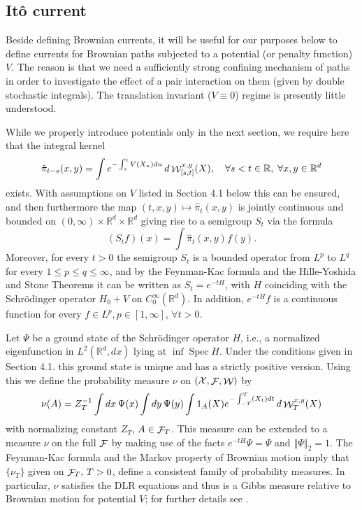 \documentclass[a4paper,11pt]{article}
\newcommand{\R}{\mathbb{R}}
\newcommand{\F}{\mathop{\mathrm{{\cal F}}}\nolimits}
\newcommand{\W}{\mathop{\mathrm{{\cal W}}}\nolimits}
\newcommand{\X}{\mathcal{X}}
\newcommand {\norm} [2] [] {\ensuremath{ \left\Vert  #2  \right\Vert_{#1} } }
\newcommand{\Spec}{\mathop{\mathrm{Spec}}\nolimits}
\newcounter {constant}
\begin{document}
\subsection{It\^o current}
\label{sec:ito-current}
Beside defining Brownian currents, it will be useful for our purposes 
below to define currents for Brownian paths subjected to a potential 
(or penalty function) $V$. The reason is that we need a sufficiently
strong confining mechanism of paths in order to investigate the effect
of a pair interaction on them (given by double stochastic integrals). 
The translation invariant ($V \equiv 0$) regime is presently little
understood. 

While we properly introduce potentials only in the next section, we 
require here that the integral kernel
\begin{equation} 
\label{fkf}
\hat\pi_{t-s}(x,y) = \int e^{- \int_s^t V(X_u)du} \, 
d\W^{x,y}_{[s,t]}(X), \quad \forall s<t \in \R, \;
\forall x,y \in \R^d
\end{equation}
exists. With assumptions on $V$ listed in Section 4.1 below this can be
ensured, and then furthermore the map $(t,x,y) \mapsto \hat \pi_t(x,y)$ 
is jointly continuous and bounded on $(0,\infty) \times \R^d \times 
\R^d$ giving rise to a semigroup $S_t$ via the formula
$$
(S_t f) (x) = \int \hat\pi_{t}(x,y) f(y).
$$
Moreover, for every $t>0$ the semigroup $S_t$ is a bounded operator 
from $L^p$ to $L^q$ for every $ 1 \leq p \leq q \leq \infty$, and by 
the Feynman-Kac formula and the Hille-Yoshida and Stone Theorems it
can be written as $S_t=e^{-tH}$, with $H$ coinciding with the
Schr\"odinger operator $H_0+V$ on $C_0^\infty(\R^d)$. In addition, 
$e^{-tH}f$ is a continuous function for every $f \in L^p, p \in 
[1,\infty]$, $\forall t > 0$. 

Let $\Psi$ be a ground state of the Schr\"odinger operator $H$, i.e., 
a normalized eigenfunction in $L^2(\R^d,dx)$ lying at $\inf\Spec H$. 
Under the conditions given in Section 4.1. this ground state is unique 
and has a strictly positive version. Using this we define the
probability measure $\nu$ on $(\X,\F,\W)$ by
\begin{equation} 
\label{pphi1}
\nu(A) = Z_T^{-1} \int  dx \, \Psi(x) \int dy \, \Psi(y) \int 1_{A}(X) 
e^{-\int_{-T}^T(X_t)dt} \, d\W^{x,y}_T(X)
\end{equation}
with normalizing constant $Z_T$, $A \in \F_{T}$. This measure can be
extended to a measure $\nu$ on the full $\F$ by making use of the 
facts $e^{-tH}\Psi = \Psi$ and $\norm[2]{\Psi} = 1$. The Feynman-Kac 
formula and the Markov property of Brownian motion imply that 
$\{\nu_T\}$ given on $\F_{T}, \,  T>0$, define a consistent family of 
probability measures. In particular, $\nu$ satisfies the DLR equations 
and thus is a Gibbs measure relative to Brownian motion for potential 
$V$; for further details see \cite{BL}. 
\end{document}
